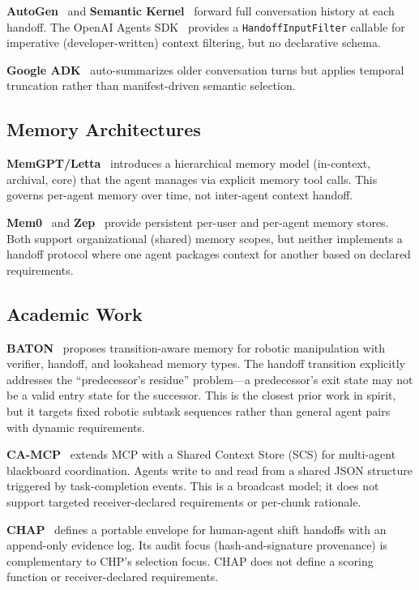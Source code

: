 \documentclass[11pt]{article}
\begin{document}
\textbf{AutoGen}~\cite{autogen} and \textbf{Semantic Kernel}~\cite{sk}
forward full conversation history at each handoff. The OpenAI Agents
SDK~\cite{openai_sdk} provides a \texttt{HandoffInputFilter} callable for
imperative (developer-written) context filtering, but no declarative schema.

\textbf{Google ADK}~\cite{adk} auto-summarizes older conversation turns but
applies temporal truncation rather than manifest-driven semantic selection.

\subsection{Memory Architectures}

\textbf{MemGPT/Letta}~\cite{packer2023memgpt} introduces a hierarchical
memory model (in-context, archival, core) that the agent manages via
explicit memory tool calls. This governs per-agent memory over time, not
inter-agent context handoff.

\textbf{Mem0}~\cite{mem0} and \textbf{Zep}~\cite{zep} provide persistent
per-user and per-agent memory stores. Both support organizational (shared)
memory scopes, but neither implements a handoff protocol where one agent
packages context for another based on declared requirements.

\subsection{Academic Work}

\textbf{BATON}~\cite{baton2024} proposes transition-aware memory for robotic
manipulation with verifier, handoff, and lookahead memory types. The handoff
transition explicitly addresses the ``predecessor's residue'' problem—a
predecessor's exit state may not be a valid entry state for the successor.
This is the closest prior work in spirit, but it targets fixed robotic
subtask sequences rather than general agent pairs with dynamic requirements.

\textbf{CA-MCP}~\cite{camcp2025} extends MCP with a Shared Context Store
(SCS) for multi-agent blackboard coordination. Agents write to and read from
a shared JSON structure triggered by task-completion events. This is a
broadcast model; it does not support targeted receiver-declared requirements
or per-chunk rationale.

\textbf{CHAP}~\cite{chap2026} defines a portable envelope for human-agent
shift handoffs with an append-only evidence log. Its audit focus
(hash-and-signature provenance) is complementary to CHP's selection focus.
CHAP does not define a scoring function or receiver-declared requirements.
\end{document}

